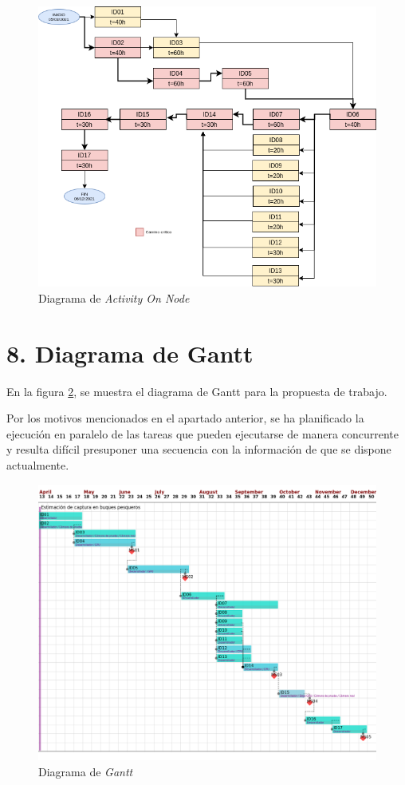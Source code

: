\documentclass[11pt]{charter}
\begin{document}
\begin{figure}[htpb]
\centering 
\includegraphics[width=1.\textwidth]{./Figuras/aon.png}
\caption{Diagrama de \textit{Activity On Node}}
\label{fig:aon}
\end{figure}

\section{8. Diagrama de Gantt}
\label{sec:gantt}

En la figura \ref{fig:gantt}, se muestra el diagrama de Gantt para la propuesta de trabajo. 

Por los motivos mencionados en el apartado anterior, se ha planificado la ejecución en paralelo de las tareas que pueden ejecutarse de manera concurrente y resulta difícil presuponer una secuencia con la información de que se dispone actualmente.

\begin{figure}[htpb]
\centering 
\includegraphics[width=1.\textwidth]{./Figuras/gantt.png}
\caption{Diagrama de \textit{Gantt}}
\label{fig:gantt}
\end{figure}
\end{document}
